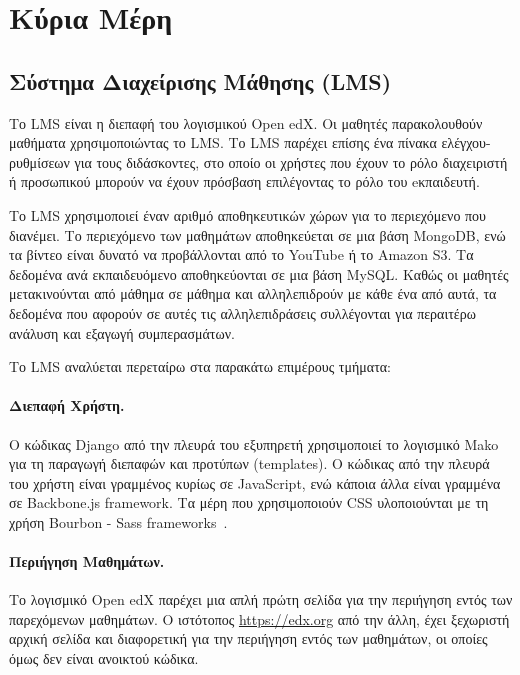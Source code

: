 \documentclass[12pt]{report}
\begin{document}
\section{Κύρια Μέρη}
\subsection{Σύστημα Διαχείρισης Μάθησης (\textlatin{LMS})}\label{lms}
Το \textlatin{LMS} είναι η διεπαφή του λογισμικού \textlatin{Open edX}. Οι μαθητές παρακολουθούν μαθήματα χρησιμοποιώντας το \textlatin{LMS}. Το \textlatin{LMS} παρέχει επίσης ένα πίνακα ελέγχου-ρυθμίσεων για τους διδάσκοντες, στο οποίο οι χρήστες που έχουν το ρόλο διαχειριστή ή προσωπικού μπορούν να έχουν πρόσβαση επιλέγοντας το ρόλο του eκπαιδευτή.

Το \textlatin{LMS} χρησιμοποιεί έναν αριθμό αποθηκευτικών χώρων για το περιεχόμενο που διανέμει. Το περιεχόμενο των μαθημάτων αποθηκεύεται σε μια βάση \textlatin{MongoDB}, ενώ τα βίντεο είναι δυνατό να προβάλλονται από το \textlatin{YouTube} ή το \textlatin{Amazon S3}. Τα δεδομένα ανά εκπαιδευόμενο αποθηκεύονται σε μια βάση \textlatin{MySQL}. Καθώς οι μαθητές μετακινούνται από μάθημα σε μάθημα και αλληλεπιδρούν με κάθε ένα από αυτά, τα δεδομένα που αφορούν σε αυτές τις αλληλεπιδράσεις συλλέγονται για περαιτέρω ανάλυση και εξαγωγή συμπερασμάτων.

Το \textlatin{LMS} αναλύεται περεταίρω στα παρακάτω επιμέρους τμήματα:
 \paragraph{Διεπαφή Χρήστη.} Ο κώδικας \textlatin{Django} από την πλευρά του εξυπηρετή χρησιμοποιεί το λογισμικό \textlatin{Mako} για τη παραγωγή διεπαφών και προτύπων (\textlatin{templates}). Ο κώδικας από την πλευρά του χρήστη είναι γραμμένος κυρίως σε \textlatin{JavaScript}, ενώ κάποια άλλα είναι γραμμένα σε \textlatin{Backbone.js framework}. Τα μέρη που χρησιμοποιούν \textlatin{CSS} υλοποιούνται με τη χρήση \textlatin{Bourbon - Sass frameworks}~\cite{edx_arch}.
 \paragraph{Περιήγηση Mαθημάτων.} Το λογισμικό \textlatin{Open edX} παρέχει μια απλή πρώτη σελίδα για την περιήγηση εντός των παρεχόμενων μαθημάτων. Ο ιστότοπος \textlatin{\url{https://edx.org}} από την άλλη, έχει ξεχωριστή αρχική σελίδα και διαφορετική για την περιήγηση εντός των μαθημάτων, οι οποίες όμως δεν είναι ανοικτού κώδικα.
\end{document}

